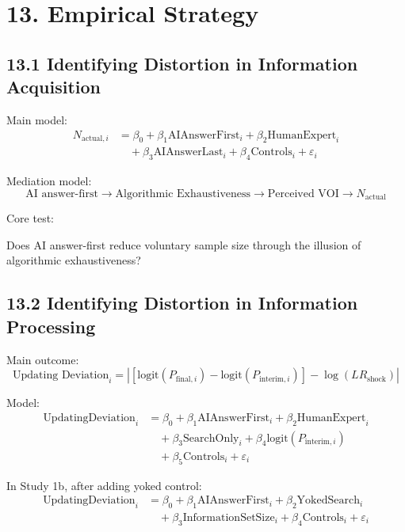 \section*{13. Empirical Strategy}

\subsection*{13.1 Identifying Distortion in Information Acquisition}

Main model:
\[
\begin{aligned}
N_{\text{actual},i}
&=
\beta_0
+ \beta_1 \text{AIAnswerFirst}_i
+ \beta_2 \text{HumanExpert}_i \\
&\quad
+ \beta_3 \text{AIAnswerLast}_i
+ \beta_4 \text{Controls}_i
+ \varepsilon_i
\end{aligned}
\]

Mediation model:
\[
\text{AI answer-first}
\rightarrow
\text{Algorithmic Exhaustiveness}
\rightarrow
\text{Perceived VOI}
\rightarrow
N_{\text{actual}}
\]

Core test:

Does AI answer-first reduce voluntary sample size through the illusion of algorithmic exhaustiveness?

\subsection*{13.2 Identifying Distortion in Information Processing}

Main outcome:
\[
\text{Updating Deviation}_i
=
\left|
\left[
\text{logit}(P_{\text{final},i}) - \text{logit}(P_{\text{interim},i})
\right]
- \log(LR_{\text{shock}})
\right|
\]

Model:
\[
\begin{aligned}
\text{UpdatingDeviation}_i
&=
\beta_0
+ \beta_1 \text{AIAnswerFirst}_i
+ \beta_2 \text{HumanExpert}_i \\
&\quad
+ \beta_3 \text{SearchOnly}_i
+ \beta_4 \text{logit}(P_{\text{interim},i}) \\
&\quad
+ \beta_5 \text{Controls}_i
+ \varepsilon_i
\end{aligned}
\]

In Study 1b, after adding yoked control:
\[
\begin{aligned}
\text{UpdatingDeviation}_i
&=
\beta_0
+ \beta_1 \text{AIAnswerFirst}_i
+ \beta_2 \text{YokedSearch}_i \\
&\quad
+ \beta_3 \text{InformationSetSize}_i
+ \beta_4 \text{Controls}_i
+ \varepsilon_i
\end{aligned}
\]

